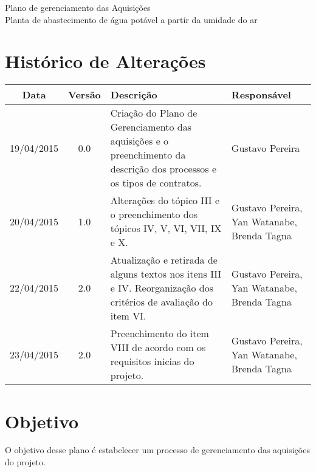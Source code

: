 

% 


\begin{center}
 {\large Plano de gerenciamento das Aquisições}\\[0.2cm]
 {Planta de abastecimento de água potável a partir da umidade do ar}\\
 \end{center}
 
 \section{Histórico de Alterações}
\begin{table}[h]
\centering
\begin{tabular}{|c|c|p{6cm}|p{5cm}|}

Data & Versão & Descrição & Responsável\\
\hline                               
19/04/2015 & 0.0 & Criação do Plano de Gerenciamento das aquisições e o preenchimento da descrição dos processos e os tipos de contratos. & Gustavo Pereira\\
\hline
20/04/2015 & 1.0 & Alterações do tópico III e o preenchimento dos tópicos IV, V, VI, VII, IX e X. & Gustavo Pereira, Yan Watanabe, Brenda Tagna\\
\hline
22/04/2015 & 2.0 & Atualização e retirada de alguns textos nos itens III e IV. Reorganização dos critérios de avaliação do item VI. & Gustavo Pereira, Yan Watanabe, Brenda Tagna\\
\hline
23/04/2015 & 2.0 & Preenchimento do item VIII de acordo com os requisitos inicias do projeto. & Gustavo Pereira, Yan Watanabe, Brenda Tagna\\
\hline
\end{tabular}
\end{table}

\section{Objetivo}
  O objetivo desse plano é estabelecer um processo de gerenciamento das aquisições do projeto.
  
